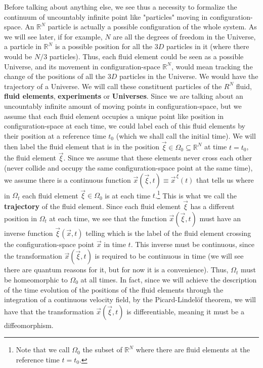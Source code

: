 \documentclass[11pt, a4paper]{article} %
\newcommand{\R}{\mathbb{R}} %
\begin{document}
Before talking about anything else, we see thus a necessity to formalize the continuum of uncountably infinite point like "particles" moving in configuration-space. An $\R^N$ particle is actually a possible configuration of the whole system. As we will see later, if for example, $N$ are all the degrees of freedom in the Universe, a particle in $\R^N$ is a possible position for all the $3D$ particles in it (where there would be $N/3$ particles). Thus, each fluid element could be seen as a possible Universe, and its movement in configuration-space $\R^N$, would mean tracking the change of the positions of all the $3D$ particles in the Universe. We would have the trajectory of a Universe. We will call these constituent particles of the $R^N$ fluid, {\bf fluid elements}, {\bf experiments} or {\bf Universes}. Since we are talking about an uncountably infinite amount of moving points in configuration-space, but we assume that each fluid element occupies a unique point like position in configuration-space at each time, we could label each of this fluid elements by their position at a reference time $t_0$ (which we shall call the initial time). We will then label the fluid element that is in the position $\vec{\xi}\in\Omega_0\subseteq \R^N$ at time $t=t_0$, the fluid element $\vec{\xi}$. Since we assume that these elements never cross each other (never collide and occupy the same configuration-space point at the same time), we assume there is a continuous function $\vec{x}(\vec{\xi},t)\equiv \vec{x}^{\, \xi}(t)$ that tells us where in $\Omega_t$ each fluid element $\vec{\xi}\in\Omega_0$ is at each time $t$.\footnote{Note that we call $\Omega_0$ the subset of $\R^N$ where there are fluid elements at the reference time $t=t_0$. } This is what we call the {\bf trajectory} of the fluid element. Since each fluid element $\vec{\xi}$ has a different position in $\Omega_t$ at each time, we see that the function $\vec{x}(\vec{\xi},t)$ must have an inverse function $\vec{\xi}(\vec{x},t)$ telling which is the label of the fluid element crossing the configuration-space point $\vec{x}$ in time $t$. This inverse must be continuous, since the transformation $\vec{x}(\vec{\xi},t)$ is required to be continuous in time (we will see there are quantum reasons for it, but for now it is a convenience). Thus, $\Omega_t$ must be homeomorphic to $\Omega_0$ at all times. In fact, since we will achieve the description of the time evolution of the positions of the fluid elements through the integration of a continuous velocity field, by the Picard-Lindelöf theorem, we will have that the transformation $\vec{x}(\vec{\xi},t)$ is differentiable, meaning it must be a diffeomorphism.
\end{document}
